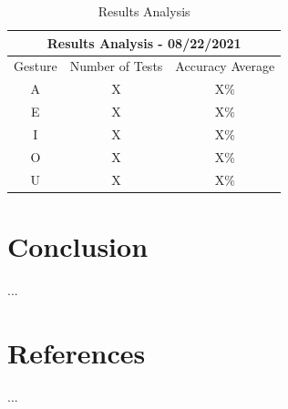 \documentclass[a4paper, 12pt]{article}
\begin{document}
\begin{table}[h!]
    \centering
    \begin{tabular}{ |c|c|c| } 
    \hline
    \multicolumn{3}{|c|}{Results Analysis - 08/22/2021} \\
    \hline
    Gesture & Number of Tests & Accuracy Average \\
    \hline
    A & X & X\% \\ 
    \hline
    E & X & X\% \\
    \hline
    I & X & X\% \\
    \hline
    O & X & X\% \\
    \hline
    U & X & X\% \\
    \hline
    \end{tabular}
    \caption{Results Analysis}
    \label{tab:results_analysis}
\end{table}


\section{Conclusion}

...




\section{References}

...


\end{document}
